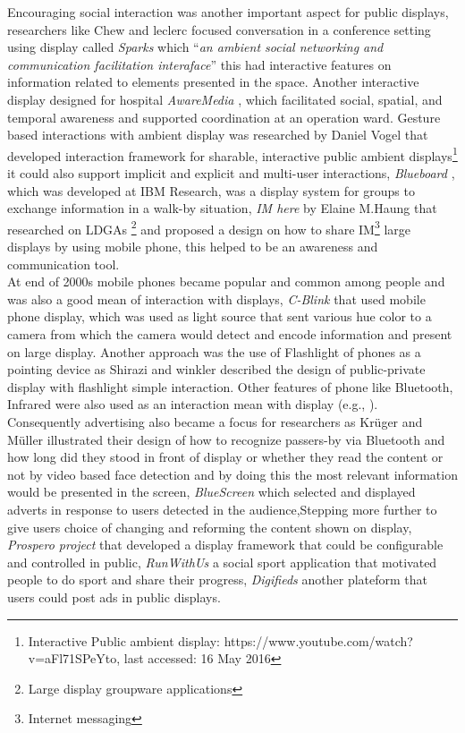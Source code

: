 Encouraging social interaction was another important aspect for public displays, researchers like Chew and leclerc \cite{chew_interaction} focused conversation in a conference setting using display called \emph{Sparks} which ``\emph{an ambient social networking and communication facilitation interaface}'' this had interactive features on information related to elements presented in the space. Another interactive display designed for hospital \emph{AwareMedia} \cite{ interactive_hospital}, which facilitated  social, spatial, and temporal awareness and supported coordination at an operation ward. Gesture based interactions with ambient display was researched by Daniel Vogel \cite{vogel} that developed interaction framework for sharable, interactive public ambient displays\footnote{Interactive Public ambient display:  https://www.youtube.com/watch?v=aFl71SPeYto, last accessed: 16 May 2016} it could also support implicit and explicit and multi-user interactions, \emph{Blueboard} \cite{blueboard} , which was developed at IBM Research, was a display system for groups to exchange information in a walk-by situation, \emph{IM here} \cite{ imahere} by Elaine M.Haung that researched on LDGAs \footnote{Large display groupware applications} and proposed a design on how to share IM\footnote{Internet messaging} large displays by using mobile phone, this helped to be an awareness and communication tool.\\

At end of 2000s mobile phones became popular and common among people and was also a good mean of interaction with displays, \emph{C-Blink} \cite{cblink} that used mobile phone display, which was used as light source that sent various hue color to a camera from which the camera would detect and encode information and present on large display. Another approach was the use of Flashlight of phones as a pointing device as Shirazi and winkler \cite{flashlight} described the design of public-private display with flashlight simple interaction. Other features of phone like Bluetooth, Infrared were also used as an interaction mean with display (e.g., \cite{bluetooth2, Bluetooth}).\\

Consequently advertising also became a focus for researchers as Krüger and Müller illustrated their design of how to recognize passers-by via Bluetooth \cite{toward_situated} and how long did they stood in front of display or whether they read the content or not by video based face detection and by doing this the most relevant information would be presented in the screen, \emph{BlueScreen} \cite{bluescreen} which selected and displayed adverts in response to users detected in the audience,Stepping more further to give users choice of changing and reforming the content shown on display, \emph{Prospero project} \cite{prospero} that developed a display framework that could be configurable and controlled in public, \emph{RunWithUs} \cite{runwithuse} a social sport application that motivated people to do sport and share their progress, \emph{Digifieds} \cite{digifieds} another plateform that users could post ads in public displays.



